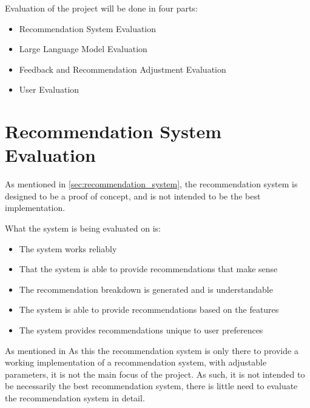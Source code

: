 





Evaluation of the project will be done in four parts:
\begin{itemize}
    \item Recommendation System Evaluation
    \item Large Language Model Evaluation
    \item Feedback and Recommendation Adjustment Evaluation
    \item User Evaluation
\end{itemize}

\section{Recommendation System Evaluation}
\label{sec:recommendation_system_evaluation}
As mentioned in \ref{sec:recommendation_system}, the recommendation system is designed to be a proof of concept, and is not intended to be the best implementation.

What the system is being evaluated on is:
\begin{itemize}
    \item The system works reliably
    \item That the system is able to provide recommendations that make sense
    \item The recommendation breakdown is generated and is understandable
    \item The system is able to provide recommendations based on the features
    \item The system provides recommendations unique to user preferences
\end{itemize}

As mentioned in 
As this the recommendation system is only there to provide a working implementation of a recommendation system, with adjustable parameters, it is not the main focus of the project.
As such, it is not intended to be necessarily the best recommendation system, there is little need to evaluate the recommendation system in detail.


